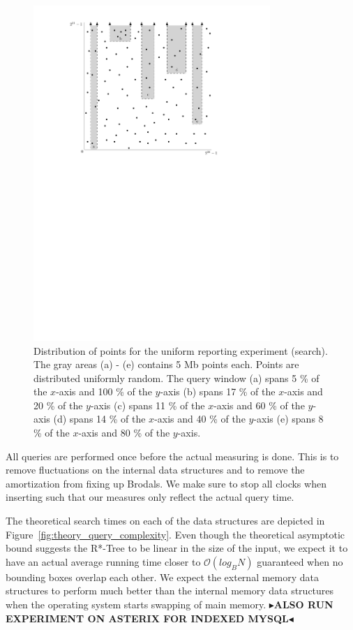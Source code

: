 \documentclass[twoside,11pt,openright]{report}
\newcommand{\todo}[1]{{\color[rgb]{.5,0,0}\textbf{$\blacktriangleright$#1$\blacktriangleleft$}}}
\begin{document}
\begin{figure}[h]
	\centering
	\includegraphics[width=0.80\textwidth]{../figures/query_uniform}
	\caption{Distribution of points for the uniform reporting experiment (search). The gray areas (a) - (e) contains 5 Mb points each. Points are distributed uniformly random. The query window (a) spans 5 \% of the $x$-axis and 100 \% of the $y$-axis (b) spans 17 \% of the $x$-axis and 20 \% of the $y$-axis (c) spans 11 \% of the $x$-axis and 60 \% of the $y$-axis (d) spans 14 \% of the $x$-axis and 40 \% of the $y$-axis (e) spans 8 \% of the $x$-axis and 80 \% of the $y$-axis.}
	\label{fig:experiment_query_uniform}
\end{figure}

All queries are performed once before the actual measuring is done. This is to remove fluctuations on the internal data structures and to remove the amortization from fixing up Brodals. We make sure to stop all clocks when inserting such that our measures only reflect the actual query time.

The theoretical search times on each of the data structures are depicted in Figure~\ref{fig:theory_query_complexity}. Even though the theoretical asymptotic bound suggests the R*-Tree to be linear in the size of the input, we expect it to have an actual average running time closer to $\mathcal{O}(log_B N)$ guaranteed when no bounding boxes overlap each other. We expect the external memory data structures to perform much better than the internal memory data structures when the operating system starts swapping of main memory. \todo{ALSO RUN EXPERIMENT ON ASTERIX FOR INDEXED MYSQL}
\end{document}
